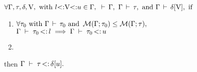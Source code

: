 \begin{lemma}%
\label{lem:sub-var-right-sub-ub}
    $\forall \Gamma, \tau, \delta, \mathrm{V}, \text{ with }
    l{\operatorname{<:}}\mathrm{V}{\operatorname{<:}}u \in \Gamma,$
    $\,\vdash\,\Gamma,\ \Gamma\,\vdash\,\tau, \text{ and }
    \Gamma\,\vdash\,\delta[\mathrm{V}],  
    \text{ if }$
    \begin{enumerate}
        \item $\forall \tau_0 \text{ with } \Gamma\,\vdash\,\tau_0 \text{ and } 
            \operatorname{\mathcal{M}}(\Gamma;\tau_0) \leq \operatorname{\mathcal{M}}(\Gamma;\tau),$\\
            $\Gamma\;\vdash\;\tau_0 \operatorname{<:} l \implies \Gamma\;\vdash\;\tau_0 \operatorname{<:} u$
        \item \subtydflt{\ty}{\plug\dctx\vany}
    \end{enumerate}
    then $\Gamma\;\vdash\;\tau \operatorname{<:} \delta[u].$
\end{lemma}
